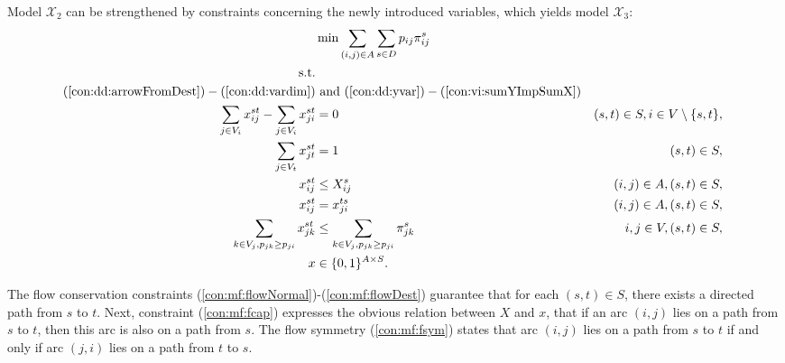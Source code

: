 Model $\mathcal{X}_2$ can be strengthened by constraints concerning the newly introduced variables, which yields model $\mathcal{X}_3$: 
\newline
\newline
\begin{subequations}[resume]\label{eq:smt-x2}
\begin{align}
\notag\makebox[0pt][l]{$\displaystyle{} \min \sum\limits_{(i,j) \in A} \sum\limits_{s \in D} p_{ij} \pi^s_{ij} $}\\
\text{s.t.} \notag \\
(\ref{con:dd:arrowFromDest}) - (\ref{con:dd:vardim}) &\text{ and }(\ref{con:dd:yvar}) - (\ref{con:vi:sumYImpSumX}) \notag\\
\label{con:mf:flowNormal} \sum\limits_{\substack{ j\in V_i}}x^{st}_{ij}-\sum\limits_{\substack{j\in V_i }}x^{st}_{ji} & = 0 & (s,t)\in S, i\in V\setminus\{s,t\},\\
\label{con:mf:flowDest} \sum\limits_{\substack{j\in V_t}}x^{st}_{jt}    & = 1  & (s,t)\in S,\\
\label{con:mf:fcap} x^{st}_{ij} &\leq X^{s}_{ij}& (i,j)\in A, (s,t)\in S,\\
\label{con:mf:fsym} x^{st}_{ij} &=  x^{ts}_{ji}& (i,j)\in A, (s,t)\in S,\\ 
\label{con:vi:sumFImpSumY} \sum\limits_{k\in V_j, p_{jk}\geq p_{ji}}x^{st}_{jk} & \leq \sum\limits_{k\in V_j, p_{jk}\geq p_{ji}}  \pi^{s}_{jk} & i,j\in V, (s,t)\in S,\\
\label{con:mf:xydim} x&\in\{0,1\}^{A\times S}. 
\end{align}~
\end{subequations}

The flow conservation constraints (\ref{con:mf:flowNormal})-(\ref{con:mf:flowDest}) guarantee that for each $(s,t)\in S$, there exists a directed path from $s$ to $t$.
Next, constraint (\ref{con:mf:fcap}) expresses the obvious relation between $X$ and $x$, that if an arc $(i,j)$ lies on a path from $s$ to $t$, then this arc is also on a path from $s$.
The flow symmetry (\ref{con:mf:fsym}) states that arc $(i,j)$ lies on a path from $s$ to $t$ if and only if arc $(j,i)$ lies on a path from $t$ to $s$.


